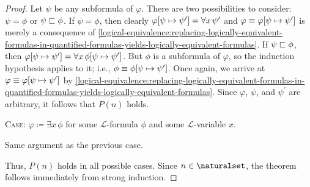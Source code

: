 \begin{proof}
    \vspace{0.1cm}
    \noindent
    Let \( \psi \) be any subformula of \( \varphi \).
    There are two possibilities to consider: \( \psi = \phi \) or \( \psi  \sqsubset  \phi \).
    If \( \psi = \phi \), then clearly \( \folsubformulasubstitution{\varphi}{\psi}{\psi^{\prime}} = \forall x \, \psi^{\prime} \) and
    \( \varphi \equiv \folsubformulasubstitution{\varphi}{\psi}{\psi^{\prime}} \) is merely a consequence of
    \cref{logical-equivalence:replacing-logically-equivalent-formulas-in-quantified-formulas-yields-logically-equivalent-formulas}.
    If \( \psi  \sqsubset  \phi \), then \( \folsubformulasubstitution{\varphi}{\psi}{\psi^{\prime}} =
    \forall x \, \folsubformulasubstitution{\phi}{\psi}{\psi^{\prime}} \).
    But \( \phi \) is a subformula of \( \varphi \), so the induction hypothesis applies to it;
    i.e., \( \phi \equiv \folsubformulasubstitution{\phi}{\psi}{\psi^{\prime}} \).
    Once again, we arrive at \( \varphi \equiv \folsubformulasubstitution{\varphi}{\psi}{\psi^{\prime}} \)
    by \cref{logical-equivalence:replacing-logically-equivalent-formulas-in-quantified-formulas-yields-logically-equivalent-formulas}.
    Since \( \varphi \), \( \psi \), and \( \psi^{\prime} \) are arbitrary, it follows that \( P(n) \) holds.

    \vspace{0.3cm}
    \noindent
    {\scshape Case:} \( \varphi \coloneq \exists x \, \phi \) for some \( \mathcal{L} \)-formula \( \phi \) and some \( \mathcal{L} \)-variable \( x \).

    \vspace{0.1cm}
    \noindent
    Same argument as the previous case.

    \vspace{0.3cm}
    \noindent
    Thus, \( P(n) \) holds in all possible cases. Since \( n \in \naturalset \), the theorem follows immediately from strong induction.
\end{proof}

